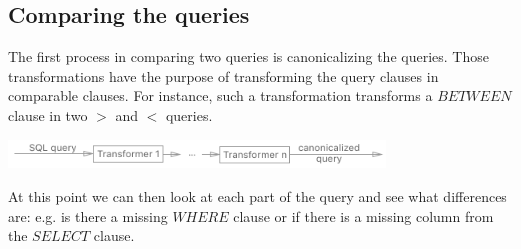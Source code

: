 \subsection{Comparing the queries} \label{design:comparing_the_queries}
The first process in comparing two queries is canonicalizing the queries.
Those transformations have the purpose of transforming the query clauses in
comparable clauses. For instance, such a transformation transforms a
$BETWEEN$ clause in two $>$ and $<$ queries.
\begin{center}
    \includegraphics[width=100mm]{images/design/transforming_process.png}
\end{center}
At this point we can then look at each part of the query and see what differences
are: e.g. is there a missing $WHERE$ clause or if there is a missing column
from the $SELECT$ clause.

